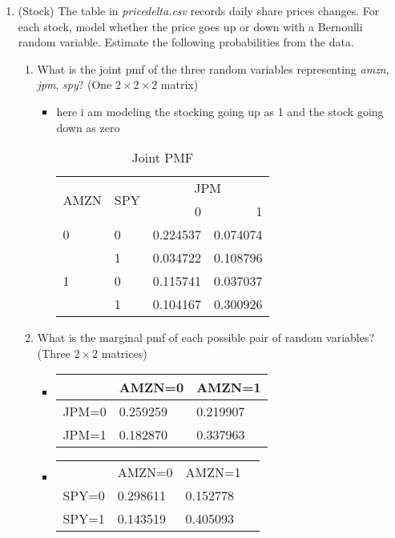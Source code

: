 \documentclass[12pt,twoside]{article}
\begin{document}
\begin{enumerate}
\item (Stock) The table in \textit{pricedelta.csv} records daily share prices changes. For each stock, model whether the price goes up or down with a Bernoulli random variable. Estimate the following probabilities from the data.
\begin{enumerate}
  \item What is the joint pmf of the three random variables representing \textit{amzn}, \textit{jpm}, \textit{spy}? (One $2 \times 2 \times 2$ matrix)
  \lipsum[1][1-4]
\begin{itemize}
    \item here i am modeling the stocking going up as 1 and the stock going down as zero
\begin{table}[h]
\caption{Joint PMF}
\centering
\begin{tabular}{llrr} 
\toprule 
\multirow{2}{*}{\parbox{4em}{AMZN}} & \multirow{2}{*}{\parbox{6em}{SPY}}  & \multicolumn{2}{c}{JPM}\\\cmidrule{3-4} 
 &  &  0 & 1\\ \midrule 
0  & 0 & 0.224537& 0.074074\\ 
& 1 & 0.034722& 0.108796\\ 
1 & 0 &  0.115741 &  0.037037\\ 
& 1& 0.104167&  0.300926\\\bottomrule 
\end{tabular}
\end{table}
\end{itemize}

\lipsum[2][7-10]
  \item What is the marginal pmf of each possible pair of random variables? (Three $2 \times 2$ matrices)
  \begin{itemize}
      \item 
        
\begin{tabular}{|l|l|l|}
       \hline & AMZN=0 & AMZN=1     \\
\hline  JPM=0 &    0.259259    &  0.219907         \\
\hline JPM=1 &  0.182870       &     0.337963       \\ \hline
\end{tabular}

\item \begin{tabular}{lll}
      & AMZN=0 & AMZN=1 &  &  \\
SPY=0 &      0.298611 &   0.152778       &  &  \\
SPY=1 &  0.143519        & 0.405093     &  &  \\


\end{tabular}
\end{itemize}
\end{enumerate}
\end{enumerate}
\end{document}
